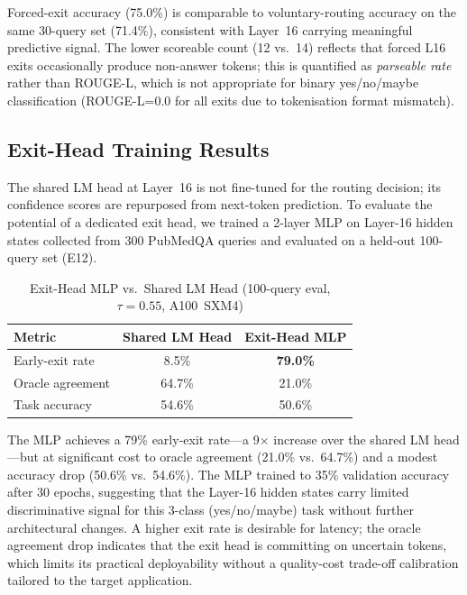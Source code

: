 \documentclass[conference]{IEEEtran}
\begin{document}
Forced-exit accuracy (75.0\%) is comparable to voluntary-routing
accuracy on the same 30-query set (71.4\%), consistent with Layer~16
carrying meaningful predictive signal.
The lower scoreable count (12 vs.\ 14) reflects that forced L16 exits
occasionally produce non-answer tokens; this is quantified as
\emph{parseable rate} rather than ROUGE-L, which is not appropriate
for binary yes/no/maybe classification (ROUGE-L=0.0 for all exits due to
tokenisation format mismatch).

\subsection{Exit-Head Training Results}
\label{sec:exithead}

The shared LM head at Layer~16 is not fine-tuned for the routing
decision; its confidence scores are repurposed from next-token
prediction.
To evaluate the potential of a dedicated exit head, we trained a
2-layer MLP on Layer-16 hidden states collected from 300 PubMedQA
queries and evaluated on a held-out 100-query set (E12).

\begin{table}[htbp]
\caption{Exit-Head MLP vs.\ Shared LM Head (100-query eval, $\tau{=}0.55$, A100~SXM4)}
\centering
\setlength{\tabcolsep}{4pt}
\begin{tabular}{@{}lcc@{}}
\toprule
\textbf{Metric} & \textbf{Shared LM Head} & \textbf{Exit-Head MLP} \\
\midrule
Early-exit rate      & 8.5\%  & \textbf{79.0\%} \\
Oracle agreement     & 64.7\% & 21.0\% \\
Task accuracy        & 54.6\% & 50.6\% \\
\bottomrule
\end{tabular}
\label{tab:exithead}
\end{table}

The MLP achieves a 79\% early-exit rate---a 9$\times$ increase over the
shared LM head---but at significant cost to oracle agreement (21.0\% vs.\
64.7\%) and a modest accuracy drop (50.6\% vs.\ 54.6\%).
The MLP trained to 35\% validation accuracy after 30 epochs, suggesting
that the Layer-16 hidden states carry limited discriminative signal for
this 3-class (yes/no/maybe) task without further architectural changes.
A higher exit rate is desirable for latency; the oracle agreement drop
indicates that the exit head is committing on uncertain tokens, which
limits its practical deployability without a quality-cost trade-off
calibration tailored to the target application.
\end{document}
